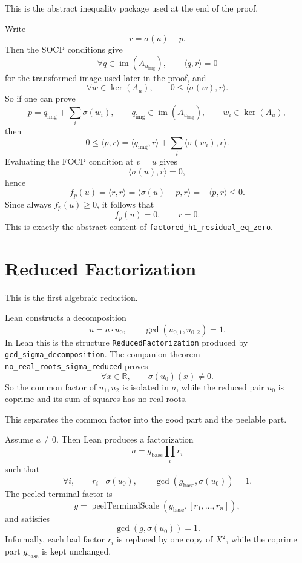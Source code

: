 This is the abstract inequality package used at the end of the proof.
\begin{proposition}\label{prop:abstract-socp}
\leanok
Write
\[
r=\sigma(u)-p.
\]
Then the SOCP conditions give
\[
\forall q \in \operatorname{im}(A_{u_{\mathrm{img}}}),\qquad \langle q,r\rangle = 0
\]
for the transformed image used later in the proof, and
\[
\forall w \in \ker(A_u),\qquad 0 \le \langle \sigma(w),r\rangle.
\]
So if one can prove
\[
p = q_{\mathrm{img}} + \sum_i \sigma(w_i),
\qquad
q_{\mathrm{img}} \in \operatorname{im}(A_{u_{\mathrm{img}}}),
\qquad
w_i \in \ker(A_u),
\]
then
\[
0 \le \langle p,r\rangle
= \langle q_{\mathrm{img}},r\rangle + \sum_i \langle \sigma(w_i),r\rangle.
\]
Evaluating the FOCP condition at $v=u$ gives
\[
\langle \sigma(u),r\rangle = 0,
\]
hence
\[
f_p(u)=\langle r,r\rangle
= \langle \sigma(u)-p,r\rangle
= -\langle p,r\rangle \le 0.
\]
Since always $f_p(u)\ge 0$, it follows that
\[
f_p(u)=0,\qquad r=0.
\]
This is exactly the abstract content of
\texttt{factored\_h1\_residual\_eq\_zero}.
\end{proposition}

\section{Reduced Factorization}

This is the first algebraic reduction.
\begin{proposition}\label{prop:reduced-factorization}
\leanok
Lean constructs a decomposition
\[
u = a \cdot u_0,
\qquad
\gcd(u_{0,1},u_{0,2})=1.
\]
In Lean this is the structure \texttt{ReducedFactorization} produced by
\texttt{gcd\_sigma\_decomposition}. The companion theorem
\texttt{no\_real\_roots\_sigma\_reduced} proves
\[
\forall x \in \mathbb R,\qquad \sigma(u_0)(x)\neq 0.
\]
So the common factor of $u_1,u_2$ is isolated in $a$, while the reduced pair
$u_0$ is coprime and its sum of squares has no real roots.
\end{proposition}

This separates the common factor into the good part and the peelable part.
\begin{proposition}\label{prop:factor-split}
\leanok
Assume $a\neq 0$. Then Lean produces a factorization
\[
a = g_{\mathrm{base}} \prod_i r_i
\]
such that
\[
\forall i,\qquad r_i \mid \sigma(u_0),
\qquad
\gcd(g_{\mathrm{base}},\sigma(u_0))=1.
\]
The peeled terminal factor is
\[
g=\operatorname{peelTerminalScale}(g_{\mathrm{base}},[r_1,\dots,r_n]),
\]
and satisfies
\[
\gcd(g,\sigma(u_0))=1.
\]
Informally, each bad factor $r_i$ is replaced by one copy of $X^2$, while the
coprime part $g_{\mathrm{base}}$ is kept unchanged.
\end{proposition}


